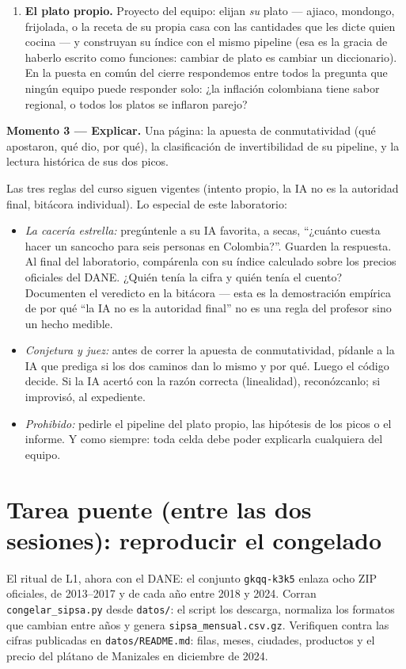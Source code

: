 \documentclass[12pt,letterpaper]{article}
\begin{document}
\begin{enumerate}[label=\arabic*.]
    \item \textbf{El plato propio.} Proyecto del equipo: elijan \emph{su} plato --- ajiaco, mondongo, frijolada, o la receta de su propia casa con las cantidades que les dicte quien cocina --- y construyan su índice con el mismo pipeline (esa es la gracia de haberlo escrito como funciones: cambiar de plato es cambiar un diccionario). En la puesta en común del cierre respondemos entre todos la pregunta que ningún equipo puede responder solo: ¿la inflación colombiana tiene sabor regional, o todos los platos se inflaron parejo?
\end{enumerate}

\textbf{Momento 3 --- Explicar.} Una página: la apuesta de conmutatividad (qué apostaron, qué dio, por qué), la clasificación de invertibilidad de su pipeline, y la lectura histórica de sus dos picos.

\begin{cajaia}
Las tres reglas del curso siguen vigentes (intento propio, la IA no es la autoridad final, bitácora individual). Lo especial de este laboratorio:
\begin{itemize}[itemsep=0.15em]
    \item \emph{La cacería estrella:} pregúntenle a su IA favorita, a secas, ``¿cuánto cuesta hacer un sancocho para seis personas en Colombia?''. Guarden la respuesta. Al final del laboratorio, compárenla con su índice calculado sobre los precios oficiales del DANE. ¿Quién tenía la cifra y quién tenía el cuento? Documenten el veredicto en la bitácora --- esta es la demostración empírica de por qué ``la IA no es la autoridad final'' no es una regla del profesor sino un hecho medible.
    \item \emph{Conjetura y juez:} antes de correr la apuesta de conmutatividad, pídanle a la IA que prediga si los dos caminos dan lo mismo y por qué. Luego el código decide. Si la IA acertó con la razón correcta (linealidad), reconózcanlo; si improvisó, al expediente.
    \item \emph{Prohibido:} pedirle el pipeline del plato propio, las hipótesis de los picos o el informe. Y como siempre: toda celda debe poder explicarla cualquiera del equipo.
\end{itemize}
\end{cajaia}

\section{Tarea puente (entre las dos sesiones): reproducir el congelado}
El ritual de L1, ahora con el DANE: el conjunto \texttt{gkqq-k3k5} enlaza ocho ZIP oficiales, de 2013--2017 y de cada año entre 2018 y 2024. Corran \texttt{congelar\_sipsa.py} desde \texttt{datos/}: el script los descarga, normaliza los formatos que cambian entre años y genera \texttt{sipsa\_mensual.csv.gz}. Verifiquen contra las cifras publicadas en \texttt{datos/README.md}: filas, meses, ciudades, productos y el precio del plátano de Manizales en diciembre de 2024.
\end{document}
